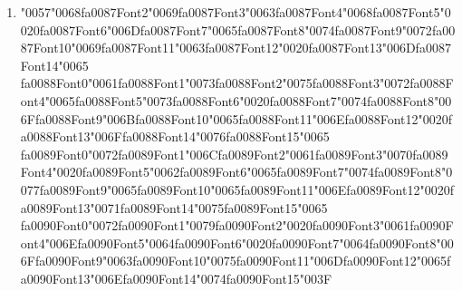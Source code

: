 \documentclass[12pt]{article}
\begin{document}
\begin{enumerate}[label=Q\arabic*.]
\item {\char"0057}{\char"0068}{\csname fa0087Font2\endcsname\char"0069}{\csname fa0087Font3\endcsname\char"0063}{\csname fa0087Font4\endcsname\char"0068}{\csname fa0087Font5\endcsname\char"0020}{\csname fa0087Font6\endcsname\char"006D}{\csname fa0087Font7\endcsname\char"0065}{\csname fa0087Font8\endcsname\char"0074}{\csname fa0087Font9\endcsname\char"0072}{\csname fa0087Font10\endcsname\char"0069}{\csname fa0087Font11\endcsname\char"0063}{\csname fa0087Font12\endcsname\char"0020}{\csname fa0087Font13\endcsname\char"006D}{\csname fa0087Font14\endcsname\char"0065} {\csname fa0088Font0\endcsname\char"0061}{\csname fa0088Font1\endcsname\char"0073}{\csname fa0088Font2\endcsname\char"0075}{\csname fa0088Font3\endcsname\char"0072}{\csname fa0088Font4\endcsname\char"0065}{\csname fa0088Font5\endcsname\char"0073}{\csname fa0088Font6\endcsname\char"0020}{\csname fa0088Font7\endcsname\char"0074}{\csname fa0088Font8\endcsname\char"006F}{\csname fa0088Font9\endcsname\char"006B}{\csname fa0088Font10\endcsname\char"0065}{\csname fa0088Font11\endcsname\char"006E}{\csname fa0088Font12\endcsname\char"0020}{\csname fa0088Font13\endcsname\char"006F}{\csname fa0088Font14\endcsname\char"0076}{\csname fa0088Font15\endcsname\char"0065} {\csname fa0089Font0\endcsname\char"0072}{\csname fa0089Font1\endcsname\char"006C}{\csname fa0089Font2\endcsname\char"0061}{\csname fa0089Font3\endcsname\char"0070}{\csname fa0089Font4\endcsname\char"0020}{\csname fa0089Font5\endcsname\char"0062}{\csname fa0089Font6\endcsname\char"0065}{\csname fa0089Font7\endcsname\char"0074}{\csname fa0089Font8\endcsname\char"0077}{\csname fa0089Font9\endcsname\char"0065}{\csname fa0089Font10\endcsname\char"0065}{\csname fa0089Font11\endcsname\char"006E}{\csname fa0089Font12\endcsname\char"0020}{\csname fa0089Font13\endcsname\char"0071}{\csname fa0089Font14\endcsname\char"0075}{\csname fa0089Font15\endcsname\char"0065} {\csname fa0090Font0\endcsname\char"0072}{\csname fa0090Font1\endcsname\char"0079}{\csname fa0090Font2\endcsname\char"0020}{\csname fa0090Font3\endcsname\char"0061}{\csname fa0090Font4\endcsname\char"006E}{\csname fa0090Font5\endcsname\char"0064}{\csname fa0090Font6\endcsname\char"0020}{\csname fa0090Font7\endcsname\char"0064}{\csname fa0090Font8\endcsname\char"006F}{\csname fa0090Font9\endcsname\char"0063}{\csname fa0090Font10\endcsname\char"0075}{\csname fa0090Font11\endcsname\char"006D}{\csname fa0090Font12\endcsname\char"0065}{\csname fa0090Font13\endcsname\char"006E}{\csname fa0090Font14\endcsname\char"0074}{\csname fa0090Font15\endcsname\char"003F}
\begin{enumerate}[label=(\Alph*)]

\end{enumerate}
\end{enumerate}
\end{document}
